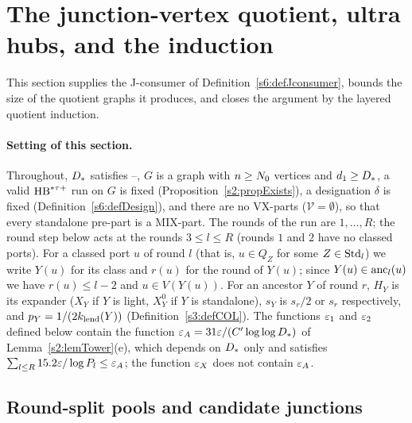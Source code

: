 \section{The junction-vertex quotient, ultra hubs, and the induction}\label{s7:sec}

This section supplies the J-consumer of Definition~\ref{s6:defJconsumer}, bounds
the size of the quotient graphs it produces, and closes the argument by the
layered quotient induction.

\paragraph{Setting of this section.}
Throughout, $D_{*}$ satisfies --, $G$ is a graph with $n\ge N_{0}$
vertices and $d_1\ge D_{*}$, a valid $\mathrm{HB}^{*\tau{+}}$ run on $G$ is fixed
(Proposition~\ref{s2:propExists}), a designation $\delta$ is fixed
(Definition~\ref{s6:defDesign}), and there are no VX-parts
($\mathcal{V}=\emptyset$), so that every standalone pre-part is a MIX-part. The
rounds of the run are $1,\dots,R$; the round step below acts at the rounds
$3\le l\le R$ (rounds $1$ and $2$ have no classed ports). For a classed port $u$
of round $l$ (that is, $u\in Q_Z$ for some $Z\in\mathrm{Std}_l$) we write $Y(u)$ for its
class and $r(u)$ for the round of $Y(u)$; since $Y(u)\in\mathrm{anc}_l(u)$ we have
$r(u)\le l-2$ and $u\in V(Y(u))$. For an ancestor $Y$ of round $r$, $H_Y$ is its
expander ($X_Y$ if $Y$ is light, $X^0_Y$ if $Y$ is standalone), $s_Y$ is $s_r/2$
or $s_r$ respectively, and $p_Y=1/(2k_{\mathrm{lend}}(Y))$ (Definition~\ref{s3:defCOL}).
The functions $\varepsilon_{1}$ and $\varepsilon_{2}$ defined below contain the function
$\varepsilon_{A}=31\varepsilon/(C'\log\log D_{*})$ of Lemma~\ref{s2:lemTower}(e), which depends
on $D_{*}$ only and satisfies $\sum_{l\le R}15.2\varepsilon/\log P_l\le\varepsilon_{A}$; the
function $\varepsilon_{X}$ does not contain $\varepsilon_{A}$.

\subsection{Round-split pools and candidate junctions}

